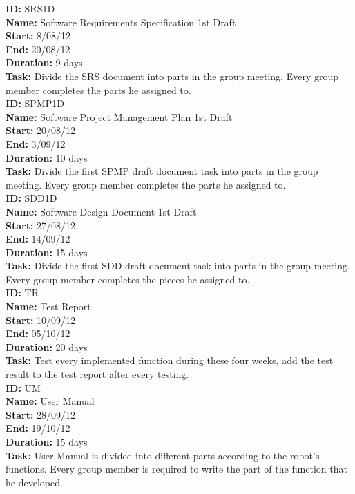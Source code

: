 \documentclass[11pt, a4paper]{report}
\begin{document}
\noindent \textbf{ID:} SRS1D \\
\noindent \textbf{Name:} Software Requirements Specification 1st Draft\\
\noindent \textbf{Start:} 8/08/12 \\
\noindent \textbf{End:} 20/08/12 \\
\noindent \textbf{Duration:} 9 days \\
\noindent \textbf{Task:} Divide the SRS document into parts in the group meeting. Every group member completes the parts he assigned to.\\[0.5cm]

\noindent \textbf{ID:} SPMP1D \\
\noindent \textbf{Name:} Software Project Management Plan 1st Draft\\
\noindent \textbf{Start:} 20/08/12 \\
\noindent \textbf{End:} 3/09/12 \\
\noindent \textbf{Duration:} 10 days \\
\noindent \textbf{Task:} Divide the first SPMP draft document task into parts in the group meeting. Every group member completes the parts he assigned to.\\[0.5cm]

\noindent \textbf{ID:} SDD1D \\
\noindent \textbf{Name:} Software Design Document 1st Draft\\
\noindent \textbf{Start:} 27/08/12 \\
\noindent \textbf{End:} 14/09/12 \\
\noindent \textbf{Duration:} 15 days \\
\noindent \textbf{Task:} Divide the first SDD draft document task into parts in the group meeting. Every group member completes the pieces he assigned to.\\[0.5cm]

\noindent \textbf{ID:} TR \\
\noindent \textbf{Name:} Test Report\\
\noindent \textbf{Start:} 10/09/12 \\
\noindent \textbf{End:} 05/10/12 \\
\noindent \textbf{Duration:} 20 days \\
\noindent \textbf{Task:} Test every implemented function during these four weeks, add the test result to the test report after every testing.\\[0.5cm]

\noindent \textbf{ID:} UM \\
\noindent \textbf{Name:} User Manual \\
\noindent \textbf{Start:} 28/09/12 \\
\noindent \textbf{End:} 19/10/12 \\
\noindent \textbf{Duration:} 15 days \\
\noindent \textbf{Task:} User Manual is divided into different parts according to the robot's functions. Every group member is required to write the part of the function that he developed.\\[0.5cm]
\end{document}
